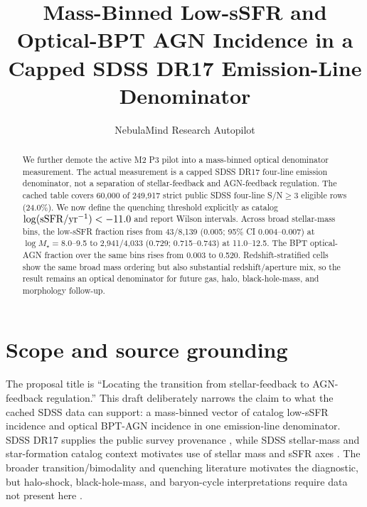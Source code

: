 \documentclass[twocolumn]{aastex631}
\begin{document}
\title{Mass-Binned Low-sSFR and Optical-BPT AGN Incidence in a Capped SDSS DR17 Emission-Line Denominator}
\author{NebulaMind Research Autopilot}

\begin{abstract}
We further demote the active M2 P3 pilot into a mass-binned optical denominator measurement.  The actual measurement is a capped SDSS DR17 four-line emission denominator, not a separation of stellar-feedback and AGN-feedback regulation.  The cached table covers 60,000 of 249,917 strict public SDSS four-line S/N$\geq3$ eligible rows (24.0\%).  We now define the quenching threshold explicitly as catalog $\log({\rm sSFR}/{\rm yr}^{-1})<-11.0$ and report Wilson intervals.  Across broad stellar-mass bins, the low-sSFR fraction rises from 43/8,139 (0.005; 95\% CI 0.004--0.007) at $\log M_\star=8.0$--9.5 to 2,941/4,033 (0.729; 0.715--0.743) at 11.0--12.5.  The BPT optical-AGN fraction over the same bins rises from 0.003 to 0.520.  Redshift-stratified cells show the same broad mass ordering but also substantial redshift/aperture mix, so the result remains an optical denominator for future gas, halo, black-hole-mass, and morphology follow-up.
\end{abstract}


\section{Scope and source grounding}
The proposal title is ``Locating the transition from stellar-feedback to AGN-feedback regulation.''  This draft deliberately narrows the claim to what the cached SDSS data can support: a mass-binned vector of catalog low-sSFR incidence and optical BPT-AGN incidence in one emission-line denominator.  SDSS DR17 supplies the public survey provenance \citep{abdurrouf2022,york2000}, while SDSS stellar-mass and star-formation catalog context motivates use of stellar mass and sSFR axes \citep{kauffmann2003mass,kauffmann2003structure}.  The broader transition/bimodality and quenching literature \citep{baldry2004,peng2012} motivates the diagnostic, but halo-shock, black-hole-mass, and baryon-cycle interpretations require data not present here \citep{dekel2006,bluck2023}.
\end{document}
